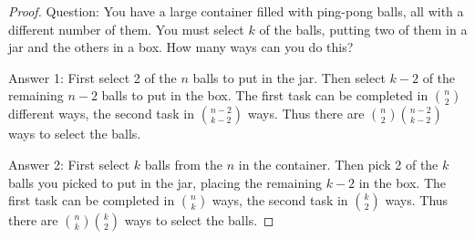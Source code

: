 \documentclass[10pt,]{book}
\theoremstyle{plain}
\theoremstyle{definition}
\theoremstyle{definition}
\theoremstyle{definition}
\numberwithin{equation}{section}
\begin{document}
\begin{exerciselist}
\begin{proof}
            Question: You have a large container filled with ping-pong balls, all with a different number of them. You must select \(k\) of the balls, putting two of them in a jar and the others in a box. How many ways can you do this?
\par

            Answer 1: First select 2 of the \(n\) balls to put in the jar. Then select \(k-2\) of the remaining \(n-2\) balls to put in the box. The first task can be completed in \({n \choose 2}\) different ways, the second task in \({n-2 \choose k-2}\) ways. Thus there are \({n \choose 2}{n-2 \choose k-2}\) ways to select the balls.
\par

            Answer 2: First select \(k\) balls from the \(n\) in the container. Then pick 2 of the \(k\) balls you picked to put in the jar, placing the remaining \(k-2\) in the box. The first task can be completed in \({n \choose k}\) ways, the second task in \({k \choose 2}\) ways. Thus there are \({n \choose k}{k \choose 2}\) ways to select the balls.
\par


\end{proof}
\end{exerciselist}
\end{document}
